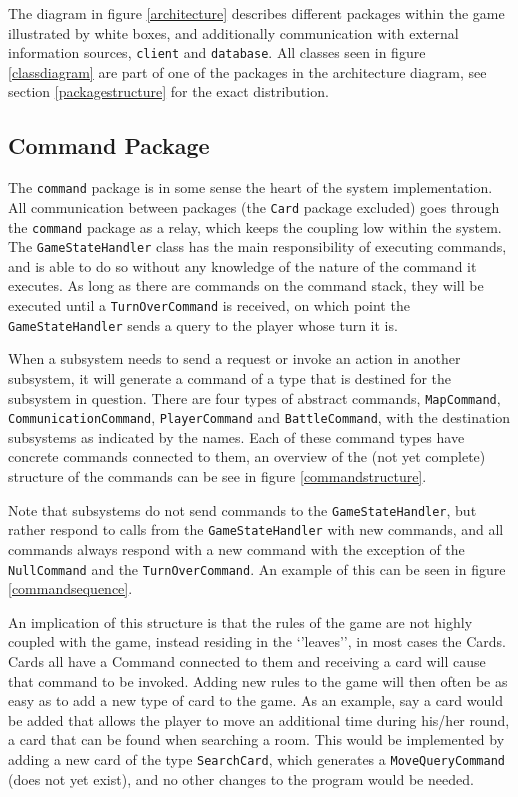 The diagram in figure \ref{architecture} describes different packages within the game illustrated by white boxes, and additionally communication with external information sources, \texttt{client} and \texttt{database}. All classes seen in figure \ref{classdiagram} are part of one of the packages in the architecture diagram, see section \ref{packagestructure} for the exact distribution.


\subsection{Command Package}
The \texttt{command} package is in some sense the heart of the system implementation. All communication between packages (the \texttt{Card} package excluded) goes through the \texttt{command} package as a relay, which keeps the coupling low within the system. The \texttt{GameStateHandler} class has the main responsibility of executing commands, and is able to do so without any knowledge of the nature of the command it executes. As long as there are commands on the command stack, they will be executed until a \texttt{TurnOverCommand} is received, on which point the \texttt{GameStateHandler} sends a query to the player whose turn it is.

When a subsystem needs to send a request or invoke an action in another subsystem, it will generate a command of a type that is destined for the subsystem in question. There are four types of abstract commands, \texttt{MapCommand}, \texttt{CommunicationCommand}, \texttt{PlayerCommand} and \texttt{BattleCommand}, with the destination subsystems as indicated by the names. Each of these command types have concrete commands connected to them, an overview of the (not yet complete) structure of the commands can be see in figure \ref{commandstructure}.

Note that subsystems do not send commands to the \texttt{GameStateHandler}, but rather respond to calls from the \texttt{GameStateHandler} with new commands, and all commands always respond with a new command with the exception of the \texttt{NullCommand} and the \texttt{TurnOverCommand}. An example of this can be seen in figure \ref{commandsequence}.

An implication of this structure is that the rules of the game are not highly coupled with the game, instead residing in the ‘’leaves’’, in most cases the Cards. Cards all have a Command connected to them and receiving a card will cause that command to be invoked. Adding new rules to the game will then often be as easy as to add a new type of card to the game. As an example, say a card would be added that allows the player to move an additional time during his/her round, a card that can be found when searching a room. This would be implemented by adding a new card of the type \texttt{SearchCard}, which generates a \texttt{MoveQueryCommand} (does not yet exist), and no other changes to the program would be needed.


